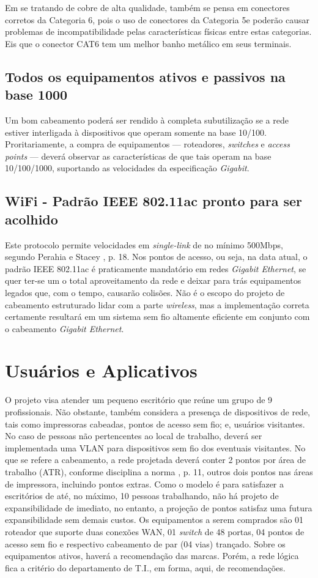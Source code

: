 \documentclass[	DIV=calc,%
							paper=a4,%
							fontsize=12pt,%
							onecolumn]{scrartcl}	 					%
\begin{document}
Em se tratando de cobre de alta qualidade, também se pensa em conectores corretos da Categoria 6, pois o uso de conectores da Categoria 5e poderão causar problemas de incompatibilidade pelas características físicas entre estas categorias. Eis que o conector CAT6 tem um melhor banho metálico em seus terminais.

\subsection{Todos os equipamentos ativos e passivos na base 1000}
Um bom cabeamento poderá ser rendido à completa subutilização se a rede estiver interligada à dispositivos que operam somente na base 10/100. Proritariamente, a compra de equipamentos --- roteadores, \textit{switches} e \textit{access points} --- deverá observar as características de que tais operam na base 10/100/1000, suportando as velocidades da especificação \textit{Gigabit}.

\subsection{WiFi - Padrão IEEE 802.11ac pronto para ser acolhido}
Este protocolo permite velocidades em \textit{single-link} de no mínimo 500Mbps, segundo Perahia e Stacey \cite{perahia2013next}, p. 18. Nos pontos de acesso, ou seja, na data atual, o padrão IEEE 802.11ac é praticamente mandatório em redes \textit{Gigabit Ethernet}, se quer ter-se um o total aproveitamento da rede e deixar para trás equipamentos legados que, com o tempo, causarão colisões. Não é o escopo do projeto de cabeamento estruturado lidar com a parte \textit{wireless}, mas a implementação correta certamente resultará em um sistema sem fio altamente eficiente em conjunto com o cabeamento \textit{Gigabit Ethernet}.


\section{Usuários e Aplicativos}
O projeto visa atender um pequeno escritório que reúne um grupo de 9 profissionais. Não obstante, também considera a presença de dispositivos de rede, tais como impressoras cabeadas, pontos de acesso sem fio; e, usuários visitantes. No caso de pessoas não pertencentes ao local de trabalho, deverá ser implementada uma VLAN para dispositivos sem fio dos eventuais visitantes. No que se refere a cabeamento, a rede projetada deverá conter 2 pontos por área de trabalho (ATR), conforme disciplina a norma \cite{abnt14565}, p. 11, outros dois pontos nas áreas de impressora, incluindo pontos extras. Como o modelo é para satisfazer a escritórios de até, no máximo, 10 pessoas trabalhando, não há projeto de expansibilidade de imediato, no entanto, a projeção de pontos satisfaz uma futura expansibilidade sem demais custos. Os equipamentos a serem comprados são 01 roteador que suporte duas conexões WAN, 01 \textit{switch} de 48 portas, 04 pontos de acesso sem fio e respectivo cabeamento de par (04 vias) trançado. Sobre os equipamentos ativos, haverá a recomendação das marcas. Porém, a rede lógica fica a critério do departamento de T.I., em forma, aqui, de recomendações.
\end{document}
